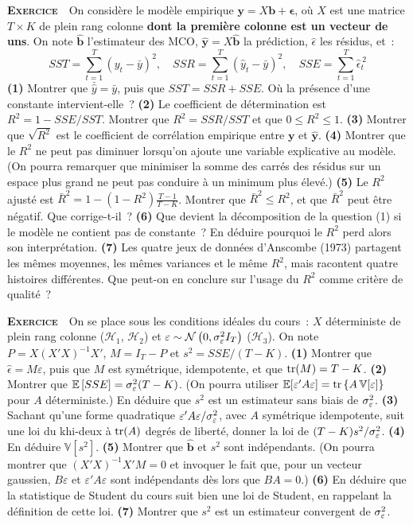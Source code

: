 \documentclass[10pt,a4paper,notitlepage]{article}
\newcounter{xnumber}
\newcommand{\exercice}{\refstepcounter{xnumber}\textsc{\textbf{Exercice}} \textbf{\thexnumber}\,\,}
\newcommand{\question}[1]{\textbf{(#1)}}
\begin{document}
\bigskip
\exercice\label{ex:r2} On considère le modèle empirique $\mathbf y = X\mathbf b + \bm\epsilon$,
où $X$ est une matrice $T\times K$ de plein rang colonne \textbf{dont la première
colonne est un vecteur de uns}. On note $\hat{\mathbf b}$ l'estimateur des MCO,
$\hat{\mathbf y}=X\hat{\mathbf b}$ la prédiction, $\hat\epsilon$ les résidus, et~:
\[
  SST = \sum_{t=1}^T (y_t-\bar y)^2,\quad
  SSR = \sum_{t=1}^T (\hat y_t-\bar y)^2,\quad
  SSE = \sum_{t=1}^T \hat\epsilon_t^{\,2}
\]
\question{1} Montrer que $\bar{\hat y} = \bar y$, puis que $SST = SSR + SSE$. Où
la présence d'une constante intervient-elle~? \question{2} Le coefficient de
détermination est $R^2 = 1-SSE/SST$. Montrer que $R^2 = SSR/SST$ et que
$0\leq R^2\leq 1$. \question{3} Montrer que $\sqrt{R^2}$ est le coefficient de
corrélation empirique entre $\mathbf y$ et $\hat{\mathbf y}$. \question{4}
Montrer que le $R^2$ ne peut pas diminuer lorsqu'on ajoute une variable
explicative au modèle. (On pourra remarquer que minimiser la somme des carrés
des résidus sur un espace plus grand ne peut pas conduire à un minimum plus
élevé.) \question{5} Le $R^2$ ajusté est
$\bar R^2 = 1-(1-R^2)\frac{T-1}{T-K}$. Montrer que $\bar R^2\leq R^2$, et que
$\bar R^2$ peut être négatif. Que corrige-t-il~? \question{6} Que devient la
décomposition de la question (1) si le modèle ne contient pas de constante~?
En déduire pourquoi le $R^2$ perd alors son interprétation. \question{7} Les
quatre jeux de données d'Anscombe (1973) partagent les mêmes moyennes, les mêmes
variances et le même $R^2$, mais racontent quatre histoires différentes. Que
peut-on en conclure sur l'usage du $R^2$ comme critère de qualité~?\newline

\bigskip

\exercice\label{ex:s2} On se place sous les conditions idéales du cours~: $X$ déterministe de
plein rang colonne ($\mathcal H_1$, $\mathcal H_2$) et
$\varepsilon\sim\mathcal N\left(0,\sigma_{\varepsilon}^2 I_T\right)$ ($\mathcal H_3$). On note
$P=X(X'X)^{-1}X'$, $M=I_T-P$ et $s^2 = SSE/(T-K)$. \question{1} Montrer que
$\hat\epsilon = M\varepsilon$, puis que $M$ est symétrique, idempotente, et que
$\mathrm{tr}(M) = T-K$. \question{2} Montrer que
$\mathbb E\left[SSE\right] = \sigma_{\varepsilon}^2 (T-K)$. (On pourra utiliser
$\mathbb E[\varepsilon'A\varepsilon] = \mathrm{tr}\left\{A\,\mathbb V[\varepsilon]\right\}$ pour
$A$ déterministe.) En déduire que $s^2$ est un estimateur sans biais
de $\sigma_{\varepsilon}^2$. \question{3} Sachant qu'une forme quadratique
$\varepsilon'A\varepsilon/\sigma_{\varepsilon}^2$, avec $A$ symétrique idempotente, suit une loi
du khi-deux à $\mathrm{tr}(A)$ degrés de liberté, donner la loi
de $(T-K)s^2/\sigma_{\varepsilon}^2$. \question{4} En déduire $\mathbb V\left[s^2\right]$.
\question{5} Montrer que $\hat{\mathbf b}$ et $s^2$ sont indépendants. (On
pourra montrer que $(X'X)^{-1}X'M = 0$ et invoquer le fait que, pour un vecteur
gaussien, $B\varepsilon$ et $\varepsilon'A\varepsilon$ sont indépendants dès
lors que $BA=0$.) \question{6} En déduire que la statistique de Student du cours
suit bien une loi de Student, en rappelant la définition de cette loi.
\question{7} Montrer que $s^2$ est un estimateur convergent de $\sigma_{\varepsilon}^2$.\newline
\end{document}
